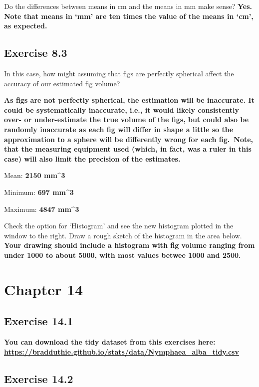 \documentclass[
  openany]{scrbook}
\begin{document}
Do the differences between means in cm and the means in mm make sense? \textbf{Yes. Note that means in `mm' are ten times the value of the means in `cm', as expected.}

\hypertarget{exercise-8.3}{%
\subsection{Exercise 8.3}\label{exercise-8.3}}

In this case, how might assuming that figs are perfectly spherical affect the accuracy of our estimated fig volume?

\textbf{As figs are not perfectly spherical, the estimation will be inaccurate. It could be systematically inaccurate, i.e., it would likely consistently over- or under-estimate the true volume of the figs, but could also be randomly inaccurate as each fig will differ in shape a little so the approximation to a sphere will be differently wrong for each fig.~Note, that the measuring equipment used (which, in fact, was a ruler in this case) will also limit the precision of the estimates.}

Mean: \textbf{2150 mm\^{}3}

Minimum: \textbf{697 mm\^{}3}

Maximum: \textbf{4847 mm\^{}3}

Check the option for `Histogram' and see the new histogram plotted in the window to the
right. Draw a rough sketch of the histogram in the area below. \textbf{Your drawing should include a histogram with fig volume ranging from under 1000 to about 5000, with most values betwee 1000 and 2500.}

\hypertarget{chapter-14}{%
\section{Chapter 14}\label{chapter-14}}

\hypertarget{exercise-14.1}{%
\subsection{Exercise 14.1}\label{exercise-14.1}}

\textbf{You can download the tidy dataset from this exercises here: \url{https://bradduthie.github.io/stats/data/Nymphaea_alba_tidy.csv}}

\hypertarget{exercise-14.2}{%
\subsection{Exercise 14.2}\label{exercise-14.2}}
\end{document}
